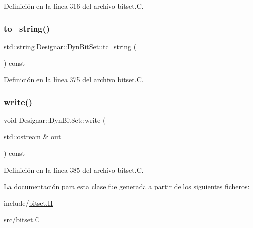 Definición en la línea 316 del archivo bitset.\+C.

\mbox{\label{class_designar_1_1_dyn_bit_set_ad393d0c9a7f15f022b0529fbe2983780}} 
\subsubsection{\texorpdfstring{to\+\_\+string()}{to\_string()}}
{\footnotesize\ttfamily std\+::string Designar\+::\+Dyn\+Bit\+Set\+::to\+\_\+string (\begin{DoxyParamCaption}{ }\end{DoxyParamCaption}) const}



Definición en la línea 375 del archivo bitset.\+C.

\mbox{\label{class_designar_1_1_dyn_bit_set_ac04df606a53e544d8e87d931be0abac0}} 
\subsubsection{\texorpdfstring{write()}{write()}}
{\footnotesize\ttfamily void Designar\+::\+Dyn\+Bit\+Set\+::write (\begin{DoxyParamCaption}\item[{std\+::ostream \&}]{out }\end{DoxyParamCaption}) const}



Definición en la línea 385 del archivo bitset.\+C.



La documentación para esta clase fue generada a partir de los siguientes ficheros\+:\begin{DoxyCompactItemize}
\item 
include/\hyperlink{bitset_8_h}{bitset.\+H}\item 
src/\hyperlink{bitset_8_c}{bitset.\+C}\end{DoxyCompactItemize}
